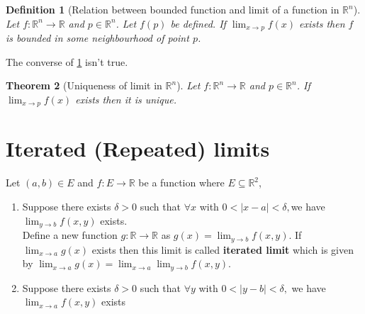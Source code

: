 \documentclass[oneside,11pt,pdftex]{book}%
\numberwithin{equation}{section}
\newtheorem{theorem}{Theorem}[chapter]%
\newtheorem{definition}[theorem]{Definition}
\numberwithin{section}{chapter}
\numberwithin{equation}{chapter}
\newcommand{\R}{\mathbb{R}}
\begin{document}
\begin{definition}[Relation between bounded function and limit of a function in $ \R^n $]\label{bounded}
	Let $ f:\R^n \rightarrow \R $ and $ p \in \R^n $. Let $ f(p) $ be defined. If $  \lim_{x\rightarrow p}f(x)  $ exists then $ f $ is bounded in some neighbourhood of point $ p $.
\end{definition}

The converse of \ref{bounded} isn't true.

\begin{theorem}[Uniqueness of limit in $ \R^n $]
	Let $ f: \R^n \rightarrow \R $ and $ p \in \R^n $. If $ \lim_{x\rightarrow p }f(x) $ exists then it is unique.
\end{theorem}


\section{Iterated (Repeated) limits}
Let $ (a,b) \in E $ and $ f:E \rightarrow \R  $ be a function where $ E \subseteq \R^2 $,
\begin{enumerate}
	\item Suppose there exists $ \delta>0 $ such that $ \forall x $ with $ 0<|x-a|<\delta, $we have $ \lim_{y\rightarrow b}f(x,y) $ exists.\\
	Define a new function $ g:\R \rightarrow \R  $ as $ g(x) = \lim_{y \rightarrow b} f(x,y)$. If $ \lim_{x \rightarrow a} g(x) $ exists then this limit is called \textbf{iterated limit} which is given by $ \lim_{x \rightarrow a} g(x)=\lim_{x \rightarrow a} \lim_{y \rightarrow b} f(x,y) $.
	\item Suppose there exists $ \delta>0  $ such that $ \forall y $ with $ 0<|y-b|<\delta, $ we have $ \lim_{x \rightarrow a } f(x,y)$ exists
\end{enumerate}
\end{document}
